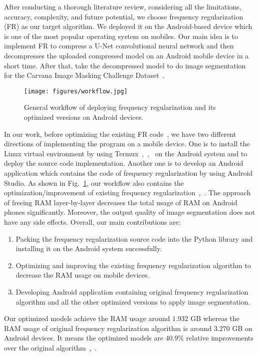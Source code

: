 \documentclass[runningheads]{llncs}
\begin{document}
After conducting a thorough literature review, considering all the limitations, accuracy, complexity, and future potential, we choose frequency regularization (FR) as our target algorithm. We deployed it on the Android-based device which is one of the most popular operating system on mobiles. Our main idea is to implement FR to compress a U-Net convolutional neural network and then decompresses the uploaded compressed model on an Android mobile device in a short time. After that, take the decompressed model to do image segmentation for the Carvana Image Masking Challenge Dataset~\cite{brian2017carvanadataset}. 

\begin{figure}[htbp]
	\centering
	\label{image:workflow}
	\texttt{[image: figures/workflow.jpg]}
	\caption{General workflow of deploying frequency regularization and its optimized versions on Android devices.}
\end{figure}

In our work, before optimizing the existing FR code~\cite{fr_repo}, we have two different directions of implementing the program on a mobile device. One is to install the Linux virtual environment by using Termux~\cite{termux_repo},~\cite{termux_overview},~\cite{termux_wiki} on the Android system and to deploy the source code implementation. Another one is to develop an Android application which contains the code of frequency regularization by using Android Studio. As shown in Fig.~\ref{image:workflow}, our workflow also contains the optimization/improvement of existing frequency regularization~\cite{zhao2023fr},~\cite{fr_repo}. The approach of freeing RAM layer-by-layer decreases the total usage of RAM on Android phones significantly. Moreover, the output quality of image segmentation does not have any side effects. Overall, our main contributions are:
\begin{enumerate}
	\item Packing the frequency regularization source code into the Python library and installing it on the Android system successfully.
	\item Optimizing and improving the existing frequency regularization algorithm to decrease the RAM usage on mobile devices.
	\item Developing Android application containing original frequency regularization algorithm and all the other optimized versions to apply image segmentation.
\end{enumerate}

Our optimized models achieve the RAM usage around $1.932$ GB whereas the RAM usage of original frequency regularization algorithm is around $3.270$ GB on Android devices. It means the optimized models are $40.9\%$ relative improvements over the original algorithm~\cite{zhao2023fr},~\cite{fr_repo}. 
\end{document}
